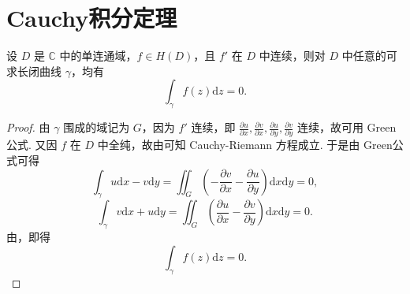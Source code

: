 \documentclass[../../main.tex]{subfiles}
\begin{document}
\section{Cauchy积分定理}

\begin{theorem}[Cauchy定理]\label{theorem:Cauchy定理}
设 \( D \) 是 \( \mathbb{C} \) 中的单连通域，\( f \in H(D) \)，且 \( f' \) 在 \( D \) 中连续，则对 \( D \) 中任意的可求长闭曲线 \( \gamma \)，均有
\[
\int_\gamma f(z)\mathrm{d}z = 0.
\]
\end{theorem}
\begin{proof}  
由 \( \gamma \) 围成的域记为 \( G \)，因为 \( f' \) 连续，即 \( \frac{\partial u}{\partial x}, \frac{\partial v}{\partial x}, \frac{\partial u}{\partial y}, \frac{\partial v}{\partial y} \) 连续，故可用 Green 公式. 又因 \( f \) 在 \( D \) 中全纯，故由可知 Cauchy-Riemann 方程成立. 于是由 Green公式可得
\[
\int_\gamma u \mathrm{d}x - v \mathrm{d}y = \iint_G \left( -\frac{\partial v}{\partial x} - \frac{\partial u}{\partial y} \right) \mathrm{d}x\mathrm{d}y = 0,
\]
\[
\int_\gamma v \mathrm{d}x + u \mathrm{d}y = \iint_G \left( \frac{\partial u}{\partial x} - \frac{\partial v}{\partial y} \right) \mathrm{d}x\mathrm{d}y = 0.
\]
由，即得
\[
\int_\gamma f(z)\mathrm{d}z = 0.
\]

\end{proof}
\end{document}
